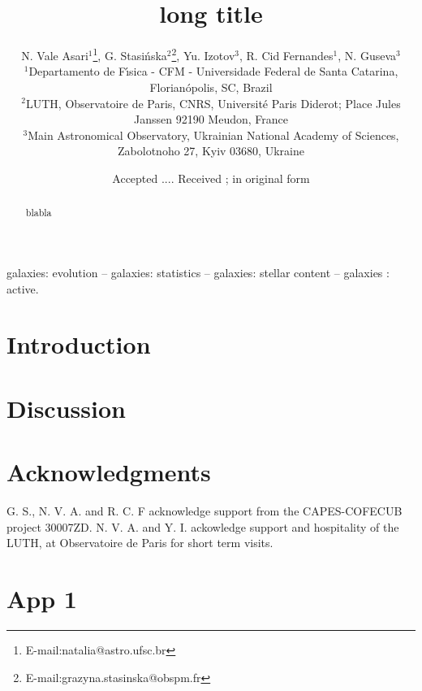 \documentclass[a4paper, useAMS, usenatbib, hyperpdf]{mn2e}
\title[H~{\sc ii} short title]
{long title}
\author[Vale Asari et al.] {
	  N. Vale Asari$^{1}$\thanks{E-mail:natalia@astro.ufsc.br}, 
          G. Stasi\'nska$^{2}$\thanks{E-mail:grazyna.stasinska@obspm.fr},
	  Yu. Izotov$^{3}$,
	  R. Cid Fernandes$^{1}$,
	  N. Guseva$^{3}$\\
          $^{1}$Departamento de F\'{\i}sica - CFM - Universidade Federal de Santa Catarina, Florian\'opolis, SC, Brazil\\
          $^{2}$LUTH, Observatoire de Paris, CNRS, Universit\'e Paris Diderot; Place Jules Janssen 92190 Meudon, France\\
          $^{3}$Main Astronomical Observatory, Ukrainian National Academy of Sciences, Zabolotnoho 27, Kyiv 03680,  Ukraine\\
	}
\begin{document}
\date{Accepted .... Received ; in original form }

\pagerange{\pageref{firstpage}--\pageref{lastpage}} 

\maketitle

\label{firstpage}

\begin{abstract} 

blabla






\end{abstract}

\begin{keywords}
galaxies:  evolution -- galaxies: statistics -- galaxies: stellar content -- galaxies : active.
\end{keywords}


\section{Introduction}


\citep{Abazajian.etal.2009a}

\section{Discussion}




\section*{Acknowledgments}
G. S., N. V. A. and R. C. F acknowledge support from the CAPES-COFECUB project 30007ZD.  
N. V. A. and Y. I. ackowledge support and hospitality of the LUTH, at Observatoire de Paris for short term visits. 




\appendix

\section{App 1}
\label{app:bias}

 
\end{document}
